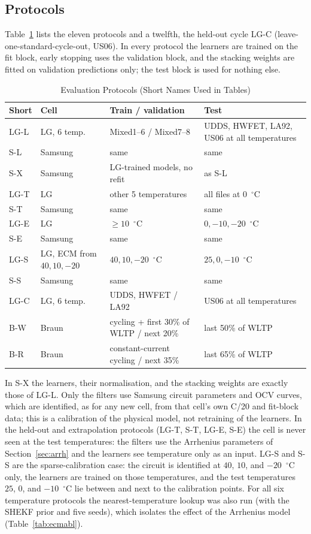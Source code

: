 \documentclass[journal]{IEEEtran}
\begin{document}
\subsection{Protocols}
Table~\ref{tab:protocols} lists the eleven protocols and a twelfth, the held-out cycle LG-C (leave-one-standard-cycle-out, US06). In every protocol the learners are trained on the fit block, early stopping uses the validation block, and the stacking weights are fitted on validation predictions only; the test block is used for nothing else.

\begin{table}[!t]
\caption{Evaluation Protocols (Short Names Used in Tables)}
\label{tab:protocols}
\centering\scriptsize
\setlength{\tabcolsep}{2.5pt}
\begin{tabular}{@{}p{0.8cm}p{1.6cm}p{2.5cm}p{2.4cm}@{}}
\toprule
Short & Cell & Train / validation & Test\\
\midrule
LG-L & LG, 6 temp. & Mixed1--6 / Mixed7--8 & UDDS, HWFET, LA92, US06 at all temperatures\\
S-L & Samsung & same & same\\
S-X & Samsung & LG-trained models, no refit & as S-L\\
LG-T & LG & other 5 temperatures & all files at 0~$^\circ$C\\
S-T & Samsung & same & same\\
LG-E & LG & $\ge10$~$^\circ$C & $0,-10,-20$~$^\circ$C\\
S-E & Samsung & same & same\\
LG-S & LG, ECM from $40,10,-20$ & $40,10,-20$~$^\circ$C & $25,0,-10$~$^\circ$C\\
S-S & Samsung & same & same\\
LG-C & LG, 6 temp. & UDDS, HWFET / LA92 & US06 at all temperatures\\
B-W & Braun & cycling + first 30\% of WLTP / next 20\% & last 50\% of WLTP\\
B-R & Braun & constant-current cycling / next 35\% & last 65\% of WLTP\\
\bottomrule
\end{tabular}
\end{table}

In S-X the learners, their normalisation, and the stacking weights are exactly those of LG-L. Only the filters use Samsung circuit parameters and OCV curves, which are identified, as for any new cell, from that cell's own C/20 and fit-block data; this is a calibration of the physical model, not retraining of the learners. In the held-out and extrapolation protocols (LG-T, S-T, LG-E, S-E) the cell is never seen at the test temperatures: the filters use the Arrhenius parameters of Section~\ref{sec:arrh} and the learners see temperature only as an input. LG-S and S-S are the sparse-calibration case: the circuit is identified at $40$, $10$, and $-20$~$^\circ$C only, the learners are trained on those temperatures, and the test temperatures $25$, $0$, and $-10$~$^\circ$C lie between and next to the calibration points. For all six temperature protocols the nearest-temperature lookup was also run (with the SHEKF prior and five seeds), which isolates the effect of the Arrhenius model (Table~\ref{tab:ecmabl}).
\end{document}

